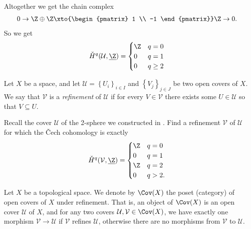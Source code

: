 \documentclass[11pt]{amsart}
\begin{document}
\begin{example}
\begin{align*}
\end{align*}
Altogether we get the chain complex
\begin{align*}
    0 \to \Z \oplus \Z \xto{\begin{pmatrix} 1 \\ -1 \end{pmatrix}} \Z \to 0.
\end{align*}
So we get
\begin{align*}
    \check{H}^q(\mathcal{U},\underline{\Z}) = \begin{cases} \Z & q=0 \\ 0 & q=1 \\ 0 & q\ge 2 \end{cases}
\end{align*}
\end{example}

\begin{definition}\label{def:refinement-open-cover} Let $X$ be a space, and let $\mathcal{U} = \left\{ U_i \right\}_{i\in I}$ and $\left\{ V_j \right\}_{j\in J}$ be two open covers of $X$. We say that $\mathcal{V}$ is a \emph{refinement} of $\mathcal{U}$ if for every $V\in \mathcal{V}$ there exists some $U \in \mathcal{U}$ so that $V \subseteq U$.
\end{definition}

\begin{exercise} Recall the cover $\mathcal{U}$ of the 2-sphere we constructed in . Find a refinement $\mathcal{V}$ of $\mathcal{U}$ for which the \v{C}ech cohomology is exactly
\begin{align*}
    \check{H}^q(\mathcal{V},\underline{\Z}) = \begin{cases} \Z & q=0 \\ 0 & q=1 \\ \Z & q=2 \\ 0 & q>2. \end{cases}
\end{align*}
\end{exercise}

\begin{definition}\label{def:covX} Let $X$ be a topological space. We denote by $\Cov(X)$ the poset (category) of open covers of $X$ under refinement. That is, an object of $\Cov(X)$ is an open cover $\mathcal{U}$ of $X$, and for any two covers $\mathcal{U},\mathcal{V} \in \Cov(X)$, we have exactly one morphism $\mathcal{V} \to \mathcal{U}$ if $\mathcal{V}$ refines $\mathcal{U}$, otherwise there are no morphisms from $\mathcal{V}$ to $\mathcal{U}$.
\end{definition}
\end{document}
